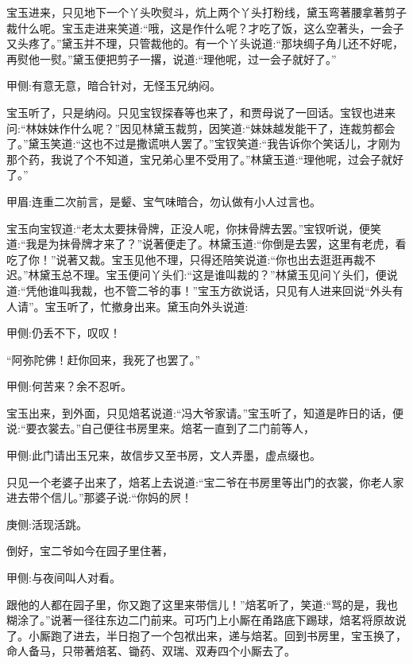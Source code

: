 \begin{parag}
    宝玉进来，只见地下一个丫头吹熨斗，炕上两个丫头打粉线，黛玉弯著腰拿著剪子裁什么呢。宝玉走进来笑道:“哦，这是作什么呢？才吃了饭，这么空著头，一会子又头疼了。”黛玉并不理，只管裁他的。有一个丫头说道:“那块绸子角儿还不好呢，再熨他一熨。”黛玉便把剪子一撂，说道:“理他呢，过一会子就好了。”\begin{note}甲侧:有意无意，暗合针对，无怪玉兄纳闷。\end{note}宝玉听了，只是纳闷。只见宝钗探春等也来了，和贾母说了一回话。宝钗也进来问:“林妹妹作什么呢？”因见林黛玉裁剪，因笑道:“妹妹越发能干了，连裁剪都会了。”黛玉笑道:“这也不过是撒谎哄人罢了。”宝钗笑道:“我告诉你个笑话儿，才刚为那个药，我说了个不知道，宝兄弟心里不受用了。”林黛玉道:“理他呢，过会子就好了。”\begin{note}甲眉:连重二次前言，是颦、宝气味暗合，勿认做有小人过言也。\end{note}宝玉向宝钗道:“老太太要抹骨牌，正没人呢，你抹骨牌去罢。”宝钗听说，便笑道:“我是为抹骨牌才来了？”说著便走了。林黛玉道:“你倒是去罢，这里有老虎，看吃了你！”说著又裁。宝玉见他不理，只得还陪笑说道:“你也出去逛逛再裁不迟。”林黛玉总不理。宝玉便问丫头们:“这是谁叫裁的？”林黛玉见问丫头们，便说道:“凭他谁叫我裁，也不管二爷的事！”宝玉方欲说话，只见有人进来回说“外头有人请”。宝玉听了，忙撤身出来。黛玉向外头说道:\begin{note}甲侧:仍丢不下，叹叹！\end{note}“阿弥陀佛！赶你回来，我死了也罢了。”\begin{note}甲侧:何苦来？余不忍听。\end{note}
\end{parag}


\begin{parag}
    宝玉出来，到外面，只见焙茗说道:“冯大爷家请。”宝玉听了，知道是昨日的话，便说:“要衣裳去。”自己便往书房里来。焙茗一直到了二门前等人，\begin{note}甲侧:此门请出玉兄来，故信步又至书房，文人弄墨，虚点缀也。\end{note}只见一个老婆子出来了，焙茗上去说道:“宝二爷在书房里等出门的衣裳，你老人家进去带个信儿。”那婆子说:“你妈的屄！\begin{note}庚侧:活现活跳。\end{note}倒好，宝二爷如今在园子里住著，\begin{note}甲侧:与夜间叫人对看。\end{note}跟他的人都在园子里，你又跑了这里来带信儿！”焙茗听了，笑道:“骂的是，我也糊涂了。”说著一径往东边二门前来。可巧门上小厮在甬路底下踢球，焙茗将原故说了。小厮跑了进去，半日抱了一个包袱出来，递与焙茗。回到书房里，宝玉换了，命人备马，只带著焙茗、锄药、双瑞、双寿四个小厮去了。
\end{parag}


